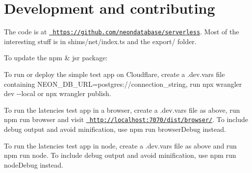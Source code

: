 \chapter{Development and contributing}
\hypertarget{md_node__modules_2_0dneondatabase_2serverless_2_d_e_v_e_l_o_p}{}\label{md_node__modules_2_0dneondatabase_2serverless_2_d_e_v_e_l_o_p}
\label{md_node__modules_2_0dneondatabase_2serverless_2_d_e_v_e_l_o_p_autotoc_md5014}%
%


The code is at \href{https://github.com/neondatabase/serverless}{\texttt{ https\+://github.\+com/neondatabase/serverless}}. Most of the interesting stuff is in {\ttfamily shims/net/index.\+ts} and the {\ttfamily export/} folder.


\begin{DoxyItemize}
\item To update the npm \& jsr package\+:
\end{DoxyItemize}


\begin{DoxyCode}{0}
\DoxyCodeLine{}
\DoxyCodeLine{}

\end{DoxyCode}



\begin{DoxyItemize}
\item To run or deploy the simple test app on Cloudflare, create a {\ttfamily .dev.\+vars} file containing {\ttfamily NEON\+\_\+\+DB\+\_\+\+URL=postgres\+://connection\+\_\+string}, run {\ttfamily npx wrangler dev -\/-\/local} or {\ttfamily npx wrangler publish}.
\item To run the latencies test app in a browser, create a {\ttfamily .dev.\+vars} file as above, run {\ttfamily npm run browser} and visit {\ttfamily \href{http://localhost:7070/dist/browser/}{\texttt{ http\+://localhost\+:7070/dist/browser/}}}. To include debug output and avoid minification, use {\ttfamily npm run browser\+Debug} instead.
\item To run the latencies test app in node, create a {\ttfamily .dev.\+vars} file as above and run {\ttfamily npm run node}. To include debug output and avoid minification, use {\ttfamily npm run node\+Debug} instead. 
\end{DoxyItemize}